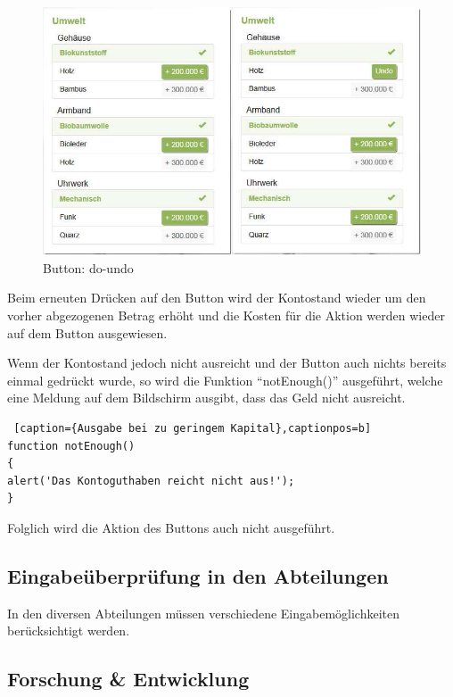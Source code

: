 \begin{figure} [H]
	\centering
	\includegraphics[scale=0.38]{img/button-do-undo.jpeg} 
	\caption{Button: do-undo} \label{fig:abb30}
\end{figure}

Beim erneuten Drücken auf den Button wird der Kontostand wieder um den vorher abgezogenen Betrag erhöht und die Kosten für die Aktion werden wieder auf dem Button ausgewiesen. 

Wenn der Kontostand jedoch nicht ausreicht und der Button auch nichts bereits einmal gedrückt wurde, so wird die Funktion \enquote{notEnough()} ausgeführt, welche eine Meldung auf dem Bildschirm ausgibt, dass das Geld nicht ausreicht. 

\lstset{language=Java}
\begin{lstlisting} [caption={Ausgabe bei zu geringem Kapital},captionpos=b]
function notEnough()
{
alert('Das Kontoguthaben reicht nicht aus!');
}
\end{lstlisting}

Folglich wird die Aktion des Buttons auch nicht ausgeführt.

\subsection*{Eingabeüberprüfung in den Abteilungen}

In den diversen Abteilungen müssen verschiedene Eingabemöglichkeiten berücksichtigt werden. 

\subsection*{Forschung \& Entwicklung}

